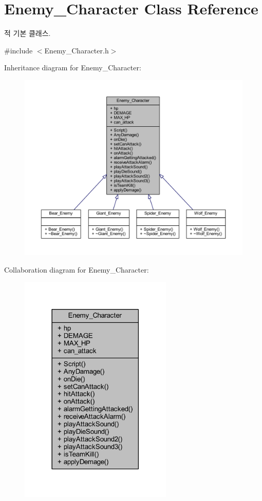 \hypertarget{class_enemy___character}{}\section{Enemy\+\_\+\+Character Class Reference}
\label{class_enemy___character}


적 기본 클래스.  




{\ttfamily \#include $<$Enemy\+\_\+\+Character.\+h$>$}



Inheritance diagram for Enemy\+\_\+\+Character\+:\nopagebreak
\begin{figure}[H]
\begin{center}
\leavevmode
\includegraphics[width=350pt]{class_enemy___character__inherit__graph}
\end{center}
\end{figure}


Collaboration diagram for Enemy\+\_\+\+Character\+:\nopagebreak
\begin{figure}[H]
\begin{center}
\leavevmode
\includegraphics[width=206pt]{class_enemy___character__coll__graph}
\end{center}
\end{figure}
